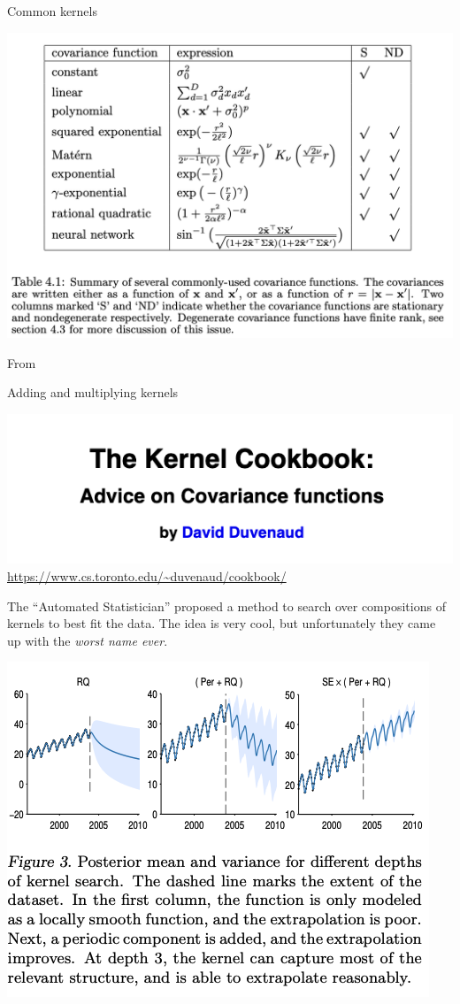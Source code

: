 \documentclass[aspectratio=169]{beamer}
\begin{document}
\begin{frame}{Common kernels}
    \begin{center}
        \includegraphics[width=.7\textwidth]{figures/lap8/kernels.png}
    \end{center}
    \vfill
    \hfill From~\citet{williams1996gaussian}
\end{frame}

\begin{frame}{Adding and multiplying kernels}
    \begin{center}
        \includegraphics[width=.7\textwidth]{figures/lap8/cookbook.png}
        \url{https://www.cs.toronto.edu/~duvenaud/cookbook/}
    \end{center}
\end{frame}

\begin{frame}{The ``Automated Statistician''}
\citet{duvenaud2013structure} proposed a method to search over compositions of kernels to best fit the data. The idea is very cool, but unfortunately they came up with the \textit{worst name ever}.

\begin{center}
    \includegraphics[width=.5\textwidth]{figures/lap8/autostat.png}
\end{center}
\end{frame}
\end{document}

